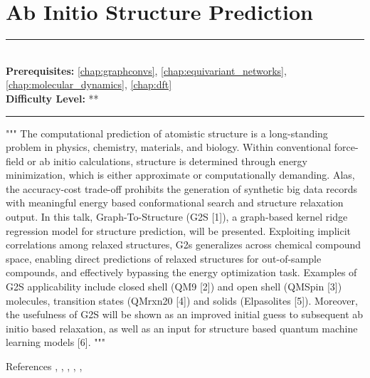 \documentclass[book.tex]{subfiles}
\begin{document}
\chapter{Ab Initio Structure Prediction}
\label{chap:cormorant}
\noindent\rule{11cm}{0.4pt} \\
\textbf{Prerequisites:} \autoref{chap:graphconvs}, \autoref{chap:equivariant_networks}, \autoref{chap:molecular_dynamics},  \autoref{chap:dft} \\
\textbf{Difficulty Level:} ** \\
\noindent\rule{11cm}{0.4pt}
\vspace{5mm}

"""
The computational prediction of atomistic structure is a long-standing problem in physics, chemistry, materials, and biology. Within conventional force-field or ab initio calculations, structure is determined through energy minimization, which is either approximate or computationally demanding. Alas, the accuracy-cost trade-off prohibits the generation of synthetic big data records with meaningful energy based conformational search and structure relaxation output.  In this talk, Graph-To-Structure (G2S [1]), a graph-based kernel ridge regression model for structure prediction, will be presented.  Exploiting implicit correlations among relaxed structures, G2s generalizes across chemical compound space,  enabling direct predictions of relaxed structures for out-of-sample compounds, and effectively bypassing the energy optimization task. Examples of G2S applicability include closed shell (QM9 [2]) and open shell (QMSpin [3]) molecules, transition states (QMrxn20 [4]) and solids (Elpasolites [5]). Moreover, the usefulness of G2S will be shown as an improved initial guess to subsequent ab initio based relaxation, as well as an input for structure based quantum machine learning models [6].
"""

References \cite{christensen2020fchl}, \cite{faber2016machine}, \cite{von2020thousands}, \cite{schwilk2020large}, \cite{ramakrishnan2014quantum}, \cite{lemm2021machine} 
\end{document}
